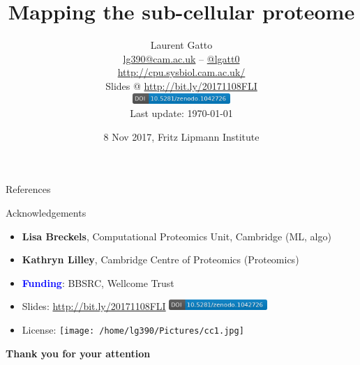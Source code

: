 \documentclass[presentation]{beamer}
\date{8 Nov 2017, Fritz Lipmann Institute}
\title{
  \textbf{Mapping the sub-cellular proteome}
}
\author{Laurent Gatto\\
  \url{lg390@cam.ac.uk} -- \url{@lgatt0}\\
  \url{http://cpu.sysbiol.cam.ac.uk/}\\
  \bigskip
  Slides @ \url{http://bit.ly/20171108FLI}\\
  \includegraphics[height=4mm]{zenodo-1042726.png}\\
  \tiny{Last update: \today}
}
\begin{document}
\maketitle







\begin{frame}[allowframebreaks]{References}
  \footnotesize
  
  
\end{frame}


\begin{frame}
  \begin{block}{Acknowledgements}
    \begin{itemize}
    \item \textbf{Lisa Breckels}, Computational Proteomics Unit,
      Cambridge (ML, algo)
    \item \textbf{Kathryn Lilley}, Cambridge Centre of Proteomics
      (Proteomics)
    \item \textcolor{Blue}{\textbf{Funding}}: BBSRC, Wellcome Trust
    \end{itemize}
  \end{block}


  {\small
    \begin{itemize}
    \item Slides: \url{http://bit.ly/20171108FLI} \includegraphics[height=4mm]{zenodo-1042726.png}
    \item License: \texttt{[image: /home/lg390/Pictures/cc1.jpg]}
    \end{itemize}
  }

  \begin{center}
    \textbf{Thank you for your attention}
  \end{center}

\end{frame}
\end{document}
